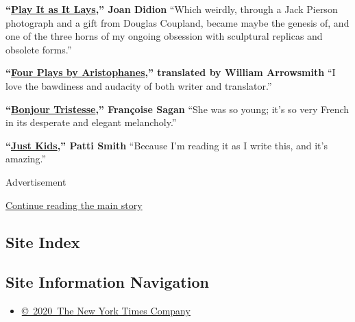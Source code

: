 \textbf{``}\href{http://www.amazon.com/Play-As-Lays-Novel-Classics/dp/0374529949/ref=sr_1_1?ie=UTF8\&qid=1439577673\&sr=8-1\&keywords=Play+It+as+It+Lays}{\textbf{Play
It as It Lays}}\textbf{,'' Joan Didion} ``Which weirdly, through a Jack
Pierson photograph and a gift from Douglas Coupland, became maybe the
genesis of, and one of the three horns of my ongoing obsession with
sculptural replicas and obsolete forms.''

\textbf{``}\href{http://www.amazon.com/Four-Plays-Aristophanes-Lysistrata-Meridian/dp/0452007178}{\textbf{Four
Plays by Aristophanes}}\textbf{,'' translated by William Arrowsmith} ``I
love the bawdiness and audacity of both writer and translator.''

\textbf{``}\href{http://www.amazon.com/Bonjour-Tristesse-Novel-Francoise-Sagan/dp/0061440795/ref=sr_1_1?ie=UTF8\&qid=1439577689\&sr=8-1\&keywords=Bonjour+Tristesse}{\textbf{Bonjour
Tristesse}}\textbf{,'' Françoise Sagan} ``She was so young; it's so very
French in its desperate and elegant melancholy.''

\textbf{``}\href{http://www.amazon.com/Just-Kids-Patti-Smith/dp/0060936223/ref=sr_1_1?ie=UTF8\&qid=1439577708\&sr=8-1\&keywords=just+kids}{\textbf{Just
Kids}}\textbf{,'' Patti Smith} ``Because I'm reading it as I write this,
and it's amazing.''

Advertisement

\protect\hyperlink{after-bottom}{Continue reading the main story}

\hypertarget{site-index}{%
\subsection{Site Index}\label{site-index}}

\hypertarget{site-information-navigation}{%
\subsection{Site Information
Navigation}\label{site-information-navigation}}

\begin{itemize}
\tightlist
\item
  \href{https://help.nytimes3xbfgragh.onion/hc/en-us/articles/115014792127-Copyright-notice}{©~2020~The
  New York Times Company}
\end{itemize}

